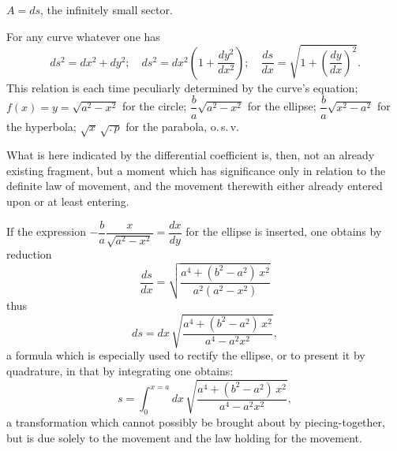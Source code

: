 \documentclass[12pt]{book}
\begin{document}
\begin{center}

$A = ds$, the infinitely small sector.
\end{center}

For any curve whatever one has
\[
ds^{2} = dx^{2} + dy^{2}; \quad
ds^{2} = dx^{2}\left(1 + \frac{dy^{2}}{dx^{2}}\right); \quad
\frac{ds}{dx} = \sqrt{1 + \left(\frac{dy}{dx}\right)^{2}}.
\]
This relation is each time peculiarly determined by the curve's
equation; $f(x) = y = \sqrt{a^{2}-x^{2}}$ for the circle;
$\dfrac{b}{a}\sqrt{a^{2}-x^{2}}$ for the ellipse;
$\dfrac{b}{a}\sqrt{x^{2}-a^{2}}$ for the hyperbola;
$\sqrt{x}\,\sqrt{.\,p}$ for the parabola\footnotemark, o.\,s.\,v.

What is here indicated by the differential coefficient is, then, not an
already existing fragment, but a moment which has significance
only in relation to the definite law of movement, and the movement therewith either
already entered upon or at least entering.

If the expression
$-\dfrac{b}{a}\dfrac{x}{\sqrt{a^{2}-x^{2}}} = \dfrac{dx}{dy}$ for
the ellipse is inserted, one obtains by reduction
\[
\frac{ds}{dx} = \sqrt{\frac{a^{4} + (b^{2}-a^{2})\,x^{2}}
  {a^{2}(a^{2}-x^{2})}}
\]
thus
\[
ds = dx\,\sqrt{\frac{a^{4} + (b^{2}-a^{2})\,x^{2}}{a^{4}-a^{2}x^{2}}},
\]
a formula which is especially used to rectify the ellipse, or
to present it by quadrature\footnotemark, in that by integrating
one obtains:
\[
s = \int_{0}^{x=a} dx\,\sqrt{\frac{a^{4} + (b^{2}-a^{2})\,x^{2}}
  {a^{4}-a^{2}x^{2}}},
\]
a transformation which cannot possibly be brought about by piecing-together, but
is due solely to the movement and the law holding for the movement.
\end{document}
